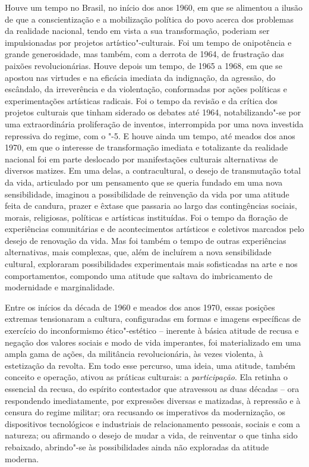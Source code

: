 Houve um tempo no Brasil, no início dos anos 1960, em que se alimentou a
ilusão de que a conscientização e a mobilização política do povo acerca
dos problemas da realidade nacional, tendo em vista a sua transformação,
poderiam ser impulsionadas por projetos artístico"-culturais. Foi um
tempo de onipotência e grande generosidade, mas também, com a derrota de
1964, de frustração das paixões revolucionárias. Houve depois um tempo,
de 1965 a 1968, em que se apostou nas virtudes e na eficácia imediata da
indignação, da agressão, do escândalo, da irreverência e da violentação,
conformadas por ações políticas e experimentações artísticas radicais.
Foi o tempo da revisão e da crítica dos projetos culturais que tinham
siderado os debates até 1964, notabilizando"-se por uma extraordinária
proliferação de inventos, interrompida por uma nova investida repressiva
do regime, com o "-5. E houve ainda um tempo, até meados dos anos 1970,
em que o interesse de transformação imediata e totalizante da realidade
nacional foi em parte deslocado por manifestações culturais alternativas
de diversos matizes. Em uma delas, a contracultural, o desejo de
transmutação total da vida, articulado por um pensamento que se queria
fundado em uma nova sensibilidade, imaginou a possibilidade de
reinvenção da vida por uma atitude feita de candura, prazer e êxtase que
passaria ao largo das contingências sociais, morais, religiosas,
políticas e artísticas instituídas. Foi o tempo da floração de
experiências comunitárias e de acontecimentos artísticos e coletivos
marcados pelo desejo de renovação da vida. Mas foi também o tempo de
outras experiências alternativas, mais complexas, que, além de incluírem
a nova sensibilidade cultural, exploraram possibilidades experimentais
mais sofisticadas na arte e nos comportamentos, compondo uma atitude que
saltava do imbricamento de modernidade e marginalidade.

Entre os inícios da década de 1960 e meados dos anos 1970, essas
posições extremas tensionaram a cultura, configuradas em formas e
imagens específicas de exercício do inconformismo ético"-estético --
inerente à básica atitude de recusa e negação dos valores sociais e modo
de vida imperantes, foi materializado em uma ampla gama de ações, da
militância revolucionária, às vezes violenta, à estetização da revolta.
Em todo esse percurso, uma ideia, uma atitude, também conceito e
operação, ativou as práticas culturais: a \emph{participação}. Ela
retinha o essencial da recusa, do espírito contestador que atravessou as
duas décadas -- ora respondendo imediatamente, por expressões diversas e
matizadas, à repressão e à censura do regime militar; ora recusando os
imperativos da modernização, os dispositivos tecnológicos e industriais
de relacionamento pessoais, sociais e com a natureza; ou afirmando o
desejo de mudar a vida, de reinventar o que tinha sido rebaixado,
abrindo"-se às possibilidades ainda não exploradas da atitude moderna.

